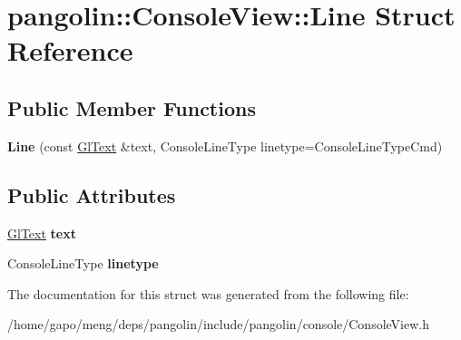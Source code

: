 \hypertarget{structpangolin_1_1_console_view_1_1_line}{}\section{pangolin\+:\+:Console\+View\+:\+:Line Struct Reference}
\label{structpangolin_1_1_console_view_1_1_line}
\subsection*{Public Member Functions}
\begin{DoxyCompactItemize}
\item 
{\bfseries Line} (const \hyperlink{classpangolin_1_1_gl_text}{Gl\+Text} \&text, Console\+Line\+Type linetype=Console\+Line\+Type\+Cmd)\hypertarget{structpangolin_1_1_console_view_1_1_line_a9dc68674dc2f808ac2a2019ab4925a6b}{}\label{structpangolin_1_1_console_view_1_1_line_a9dc68674dc2f808ac2a2019ab4925a6b}

\end{DoxyCompactItemize}
\subsection*{Public Attributes}
\begin{DoxyCompactItemize}
\item 
\hyperlink{classpangolin_1_1_gl_text}{Gl\+Text} {\bfseries text}\hypertarget{structpangolin_1_1_console_view_1_1_line_ab0700d6bb1eb86d59522dc8fe95a2df1}{}\label{structpangolin_1_1_console_view_1_1_line_ab0700d6bb1eb86d59522dc8fe95a2df1}

\item 
Console\+Line\+Type {\bfseries linetype}\hypertarget{structpangolin_1_1_console_view_1_1_line_a0ad2f48d2a8532ea64a21092d89b6086}{}\label{structpangolin_1_1_console_view_1_1_line_a0ad2f48d2a8532ea64a21092d89b6086}

\end{DoxyCompactItemize}


The documentation for this struct was generated from the following file\+:\begin{DoxyCompactItemize}
\item 
/home/gapo/meng/deps/pangolin/include/pangolin/console/Console\+View.\+h\end{DoxyCompactItemize}
